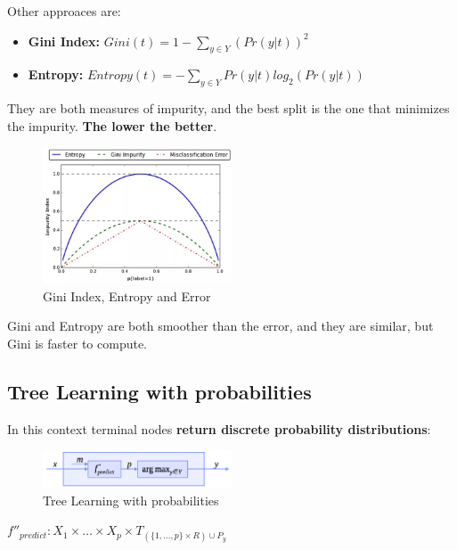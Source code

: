 Other approaces are:
\begin{itemize}
    \item \textbf{Gini Index:} $Gini(t) = 1 - \sum_{y \in Y}^{}(Pr(y|t))^2$
    \item \textbf{Entropy:} $Entropy(t) = -\sum_{y \in Y}^{}Pr(y|t)log_2(Pr(y|t))$
\end{itemize}

They are both measures of impurity, and the best split is the one that minimizes the impurity. \textbf{The lower the better}.

\begin{center}
    \begin{figure}[H]
        \centering
        \includegraphics[width=0.5\textwidth]{assets/fig14.png}
        \caption{Gini Index, Entropy and Error}
    \end{figure}
\end{center}

Gini and Entropy are both smoother than the error, and they are similar, but Gini is faster to compute.

\subsection{Tree Learning with probabilities}

In this context terminal nodes \textbf{return discrete probability distributions}:

\begin{center}
    \begin{figure}[H]
        \centering
        \includegraphics[width=0.5\textwidth]{assets/fig15.png}
        \caption{Tree Learning with probabilities}
    \end{figure}
\end{center}

\begin{center}
    $f''_{predict} : X_1 \times \dots \times X_p \times T_{(\{1, \dots, p\} \times R)\cup P_y}$
\end{center}

